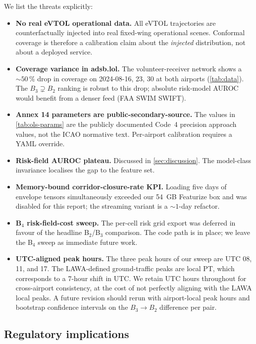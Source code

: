 We list the threats explicitly:
\begin{itemize}
\item \textbf{No real eVTOL operational data.} All eVTOL trajectories are
    counterfactually injected into real fixed-wing operational scenes.
    Conformal coverage is therefore a calibration claim about the
    \emph{injected} distribution, not about a deployed service.
\item \textbf{Coverage variance in adsb.lol.} The volunteer-receiver
    network shows a $\sim 50\,\%$ drop in coverage on 2024-08-{16, 23, 30}
    at both airports (\cref{tab:data}). The $B_3 \supsetneq B_2$ ranking
    is robust to this drop; absolute risk-model AUROC would benefit from
    a denser feed (FAA SWIM SWIFT).
\item \textbf{Annex 14 parameters are public-secondary-source.} The values
    in \cref{tab:ols-params} are the publicly documented Code~4 precision
    approach values, not the ICAO normative text. Per-airport calibration
    requires a YAML override.
\item \textbf{Risk-field AUROC plateau.} Discussed in
    \cref{sec:discussion}. The model-class invariance localises the gap to
    the feature set.
\item \textbf{Memory-bound corridor-closure-rate KPI.} Loading
    five days of envelope tensors simultaneously exceeded our 54~GB
    Featurize box and was disabled for this report; the streaming
    variant is a $\sim 1$-day refactor.
\item \textbf{B$_4$ risk-field-cost sweep.} The per-cell risk grid export
    was deferred in favour of the headline B$_2$/B$_3$ comparison. The
    code path is in place; we leave the B$_4$ sweep as immediate future
    work.
\item \textbf{UTC-aligned peak hours.} The three peak hours of our sweep
    are UTC 08, 11, and 17. The LAWA-defined ground-traffic peaks are
    local PT, which corresponds to a 7-hour shift in UTC. We retain UTC
    hours throughout for cross-airport consistency, at the cost of not
    perfectly aligning with the LAWA local peaks. A future revision should
    rerun with airport-local peak hours and bootstrap confidence intervals
    on the $B_3 \to B_2$ difference per pair.
\end{itemize}

\subsection{Regulatory implications}

